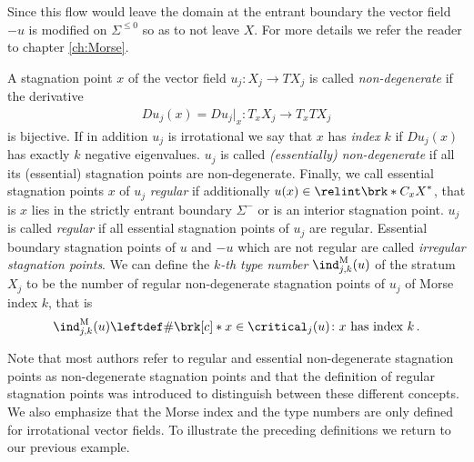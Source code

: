 Since this flow would leave the domain at the entrant boundary the vector field $-u$ is modified on $\Sigma^{\leq0}$ 
so as to not leave $X$.
For more details we refer the reader to chapter \ref{ch:Morse}.
\begin{definition}\label{df:nonDegeneracy}
  A stagnation point $x$ of the vector field $u_j\colon X_j\to TX_j$ is called
  \emph{non-degenerate} if the derivative 
  \begin{align*}
    Du_j(x)=Du_j\big\vert_x\colon T_xX_j\to T_xTX_j
  \end{align*}
  is bijective.
  If in addition $u_j$ is irrotational we say that $x$ has \emph{index} $k$
  if $Du_j(x)$ has exactly $k$ negative eigenvalues.
  $u_j$ is called \emph{(essentially) non-degenerate} if all its (essential) stagnation points
  are non-degenerate.
  Finally, we call essential stagnation points $x$ of $u_j$ \emph{regular} if additionally $u(x)\in\relint \brk*{C_xX}^*$,
  that is $x$ lies in the strictly entrant boundary $\Sigma^-$ or is an interior stagnation point.
  $u_j$ is called \emph{regular} if all essential stagnation points of $u_j$ are regular.
  Essential boundary stagnation points of $u$ and $-u$ which are not regular are called \emph{irregular stagnation points}.
  We can define the \emph{$k$-th type number} $\ind^\text{M}_{j,k}(u)$ of the
  stratum $X_j$ to be the number of regular non-degenerate stagnation points of $u_j$ of Morse index $k$,
  that is
  \begin{align}
    \ind^\text{M}_{j,k}(u)\leftdef\#\brk[c]*{x\in\critical_j(u)\colon x\text{ has index }k}\,.\label{eq:def_typenbr_strata}
  \end{align}
\end{definition}
Note that most authors refer to regular and essential non-degenerate stagnation points as non-degenerate stagnation points
and that the definition of regular stagnation points was introduced to distinguish between these different concepts.
We also emphasize that the Morse index and the type numbers are only defined for irrotational vector fields.
To illustrate the preceding definitions we return to our previous example.
